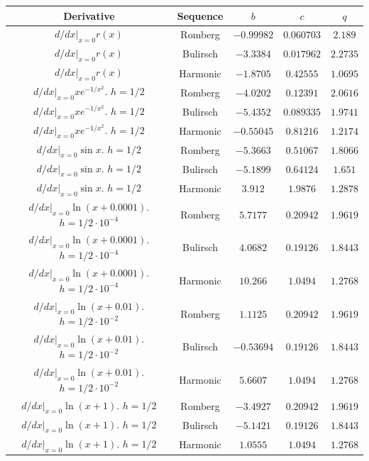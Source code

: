 \begin{table}[H]
    \centering
    \begin{tabular}{c|c||c|c|c}
        Derivative & Sequence & \(b\) & \(c\) & \(q\) \\\hline\hline
$d/dx|_{x=0}r(x)$ & Romberg & \(-0.99982\) & \(0.060703\) & \(2.189\) \\
$d/dx|_{x=0}r(x)$ & Bulirsch & \(-3.3384\) & \(0.017962\) & \(2.2735\) \\
$d/dx|_{x=0}r(x)$ & Harmonic & \(-1.8705\) & \(0.42555\) & \(1.0695\) \\
$d/dx|_{x=0}xe^{-1/x^2}$. $h=1/2$ & Romberg & \(-4.0202\) & \(0.12391\) & \(2.0616\) \\
$d/dx|_{x=0}xe^{-1/x^2}$. $h=1/2$ & Bulirsch & \(-5.4352\) & \(0.089335\) & \(1.9741\) \\
$d/dx|_{x=0}xe^{-1/x^2}$. $h=1/2$ & Harmonic & \(-0.55045\) & \(0.81216\) & \(1.2174\) \\
$d/dx|_{x=0}\sin x$. $h=1/2$ & Romberg & \(-5.3663\) & \(0.51067\) & \(1.8066\) \\
$d/dx|_{x=0}\sin x$. $h=1/2$ & Bulirsch & \(-5.1899\) & \(0.64124\) & \(1.651\) \\
$d/dx|_{x=0}\sin x$. $h=1/2$ & Harmonic & \(3.912\) & \(1.9876\) & \(1.2878\) \\
$d/dx|_{x = 0} \ln (x + 0.0001)$. $h=1/2\cdot 10^{-4}$ & Romberg & \(5.7177\) & \(0.20942\) & \(1.9619\) \\
$d/dx|_{x = 0} \ln (x + 0.0001)$. $h=1/2\cdot 10^{-4}$ & Bulirsch & \(4.0682\) & \(0.19126\) & \(1.8443\) \\
$d/dx|_{x = 0} \ln (x + 0.0001)$. $h=1/2\cdot 10^{-4}$ & Harmonic & \(10.266\) & \(1.0494\) & \(1.2768\) \\
$d/dx|_{x=0} \ln (x + 0.01)$. $h=1/2\cdot 10^{-2}$ & Romberg & \(1.1125\) & \(0.20942\) & \(1.9619\) \\
$d/dx|_{x=0} \ln (x + 0.01)$. $h=1/2\cdot 10^{-2}$ & Bulirsch & \(-0.53694\) & \(0.19126\) & \(1.8443\) \\
$d/dx|_{x=0} \ln (x + 0.01)$. $h=1/2\cdot 10^{-2}$ & Harmonic & \(5.6607\) & \(1.0494\) & \(1.2768\) \\
$d/dx|_{x=0} \ln(x + 1)$. $h=1/2$ & Romberg & \(-3.4927\) & \(0.20942\) & \(1.9619\) \\
$d/dx|_{x=0} \ln(x + 1)$. $h=1/2$ & Bulirsch & \(-5.1421\) & \(0.19126\) & \(1.8443\) \\
$d/dx|_{x=0} \ln(x + 1)$. $h=1/2$ & Harmonic & \(1.0555\) & \(1.0494\) & \(1.2768\) \\

\end{tabular}
\end{table}
